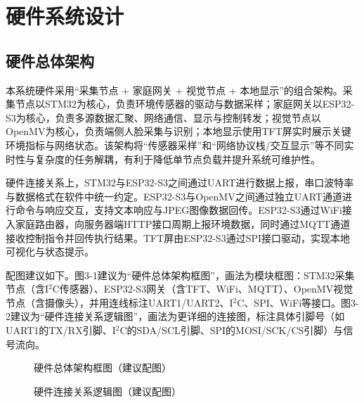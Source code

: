 
\section{硬件系统设计}

\subsection{硬件总体架构}
\par 本系统硬件采用“采集节点 + 家庭网关 + 视觉节点 + 本地显示”的组合架构。采集节点以STM32为核心，负责环境传感器的驱动与数据采样；家庭网关以ESP32-S3为核心，负责多源数据汇聚、网络通信、显示与控制转发；视觉节点以OpenMV为核心，负责端侧人脸采集与识别；本地显示使用TFT屏实时展示关键环境指标与网络状态。该架构将“传感器采样”和“网络协议栈/交互显示”等不同实时性与复杂度的任务解耦，有利于降低单节点负载并提升系统可维护性。
\par 硬件连接关系上，STM32与ESP32-S3之间通过UART进行数据上报，串口波特率与数据格式在软件中统一约定。ESP32-S3与OpenMV之间通过独立UART通道进行命令与响应交互，支持文本响应与JPEG图像数据回传。ESP32-S3通过WiFi接入家庭路由器，向服务器端HTTP接口周期上报环境数据，同时通过MQTT通道接收控制指令并回传执行结果。TFT屏由ESP32-S3通过SPI接口驱动，实现本地可视化与状态提示。

\par 配图建议如下。图3-1建议为“硬件总体架构框图”，画法为模块框图：STM32采集节点（含I\(^2\)C传感器）、ESP32-S3网关（含TFT、WiFi、MQTT）、OpenMV视觉节点（含摄像头），并用连线标注UART1/UART2、I\(^2\)C、SPI、WiFi等接口。图3-2建议为“硬件连接关系逻辑图”，画法为更详细的连接图，标注具体引脚号（如UART1的TX/RX引脚、I\(^2\)C的SDA/SCL引脚、SPI的MOSI/SCK/CS引脚）与信号流向。
\begin{figure}[H]
\centering
{}
\caption{硬件总体架构框图（建议配图）}
\label{fig:hardware_architecture}
\end{figure}
\begin{figure}[H]
\centering
{}
\caption{硬件连接关系逻辑图（建议配图）}
\label{fig:hardware_connections}
\end{figure}

